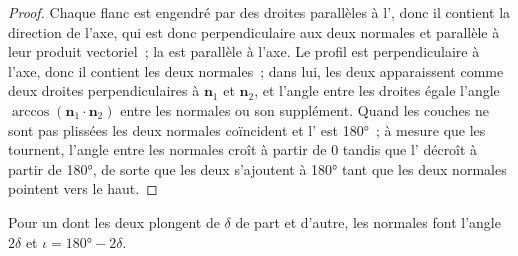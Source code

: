 \begin{proof}
Chaque flanc est engendré par des droites parallèles à l', donc il contient la
direction de l'axe, qui est donc perpendiculaire aux deux normales et
parallèle à leur produit vectoriel~; la  est parallèle à l'axe. Le
profil est perpendiculaire à l'axe, donc il contient les deux normales~; dans lui, les
deux  apparaissent comme deux droites perpendiculaires à $\mathbf n_1$ et
$\mathbf n_2$, et l'angle entre les droites égale l'angle
$\arccos(\mathbf n_1\cdot\mathbf n_2)$ entre les normales ou son supplément.
Quand les couches ne sont pas plissées les deux normales coïncident et l'
est \ang{180}~; à mesure que les  tournent, l'angle entre les normales croît
à partir de $0$ tandis que l' décroît à partir de \ang{180}, de sorte que les deux
s'ajoutent à \ang{180} tant que les deux normales pointent vers le haut.
\end{proof}

Pour un  dont les deux  plongent de $\delta$ de part et d'autre, les normales
font l'angle $2\delta$ et $\iota = \ang{180} - 2\delta$.


